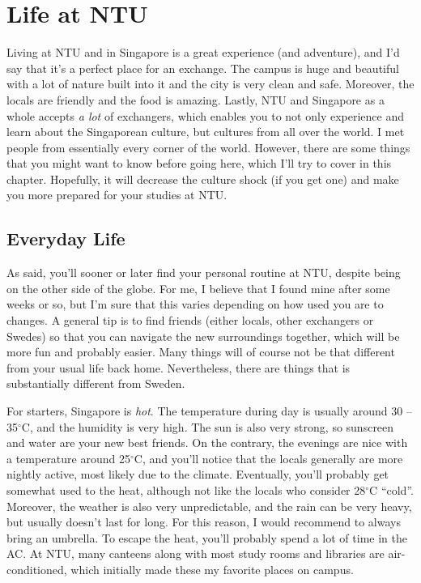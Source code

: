 \chapter*{Life at NTU}
{}
Living at NTU and in Singapore is a great experience (and adventure), and I'd say that it's a perfect place for an exchange. The campus is huge and beautiful with a lot of nature built into it and the city is very clean and safe. Moreover, the locals are friendly and the food is amazing. Lastly, NTU and Singapore as a whole accepts \textit{a lot} of exchangers, which enables you to not only experience and learn about the Singaporean culture, but cultures from all over the world. I met people from essentially every corner of the world. However, there are some things that you might want to know before going here, which I'll try to cover in this chapter. Hopefully, it will decrease the culture shock (if you get one) and make you more prepared for your studies at NTU.
\vspace{-0.2cm}
\section*{Everyday Life}\label{everyday}
{}
As said, you'll sooner or later find your personal routine at NTU, despite being on the other side of the globe. For me, I believe that I found mine after some weeks or so, but I'm sure that this varies depending on how used you are to changes. A general tip is to find friends (either locals, other exchangers or Swedes) so that you can navigate the new surroundings together, which will be more fun and probably easier. Many things will of course not be that different from your usual life back home. Nevertheless, there are things that is substantially different from Sweden.

For starters, Singapore is \textit{hot}. The temperature during day is usually around 30 -- 35$^\circ$C, and the humidity is very high. The sun is also very strong, so sunscreen and water are your new best friends. On the contrary, the evenings are nice with a temperature around 25$^\circ$C, and you'll notice that the locals generally are more nightly active, most likely due to the climate. Eventually, you'll probably get somewhat used to the heat, although not like the locals who consider 28$^\circ$C ``cold''. Moreover, the weather is also very unpredictable, and the rain can be very heavy, but usually doesn't last for long. For this reason, I would recommend to always bring an umbrella. To escape the heat, you'll probably spend a lot of time in the AC. At NTU, many canteens along with most study rooms and libraries are air-conditioned, which initially made these my favorite places on campus.

